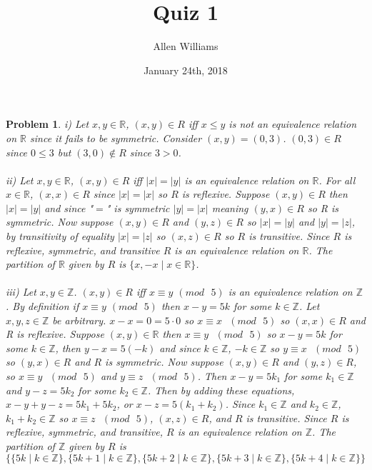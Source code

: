 \documentclass{article}
\title{Quiz 1}
\author{Allen Williams }
\date{January 24th, 2018}
\newtheorem{Problem}{Problem}
\begin{document}
\maketitle

\begin{Problem}
 i) Let $x,y\in\mathbb{R}$, $(x,y)\in R$ iff $x\leq y$ is not an equivalence relation on $\mathbb{R}$ since it fails to be symmetric.  Consider $(x,y)=(0,3)$.  $(0,3)\in R$ since $0\leq3$ but $(3,0)\not\in R$ since $3>0$.\\\\
ii) Let $x,y\in\mathbb{R}$, $(x,y)\in R$ iff $\lvert x\rvert=\lvert y\rvert$ is an equivalence relation on $\mathbb{R}$.  For all $x\in\mathbb{R}$, $(x,x)\in R$ since $\lvert x\rvert=\lvert x\rvert$ so $R$ is reflexive.  Suppose $(x,y)\in R$ then $\lvert x\rvert = \lvert y\rvert$ and since "$=$" is symmetric $\lvert y\rvert=\lvert x\rvert$ meaning $(y,x)\in R$ so R is symmetric.  Now suppose $(x,y)\in R $ and $(y,z)\in R$ so $\lvert x\rvert =\lvert y\rvert$ and $\lvert y\rvert=\lvert z\rvert$, by transitivity of equality $\lvert x\rvert=\lvert z\rvert$ so $(x,z)\in R$ so $R$ is transitive.  Since $R$ is reflexive, symmetric, and transitive $R$ is an equivalence relation on $\mathbb{R}$.  The partition of $\mathbb{R}$ given by $R$ is $\{x,-x\mid x\in\mathbb{R}\}$. \\\\
iii) Let $x,y\in\mathbb{Z}$.  $(x,y)\in R$ iff $x\equiv y$ $(mod\text{ }5)$ is an equivalence relation on $\mathbb{Z}$.  By definition if $x\equiv y$ $(mod\text{ }5)$ then $x-y=5k$ for some $k\in\mathbb{Z}$.  Let $x,y,z\in\mathbb{Z}$ be arbitrary.  $x-x=0=5\cdot0$ so $x\equiv x\text{ }(mod\text{ }5)$ so $(x,x)\in R$ and R is reflexive.  Suppose $(x,y)\in\mathbb{R}$ then $x\equiv y\text{ }(mod\text{ }5)$ so $x-y=5k$ for some $k\in\mathbb{Z}$, then $y-x=5(-k)$ and since $k\in\mathbb{Z}$, $-k\in\mathbb{Z}$ so $y\equiv x\text{ }(mod\text{ }5)$ so $(y,x)\in R$ and $R$ is symmetric.  Now suppose $(x,y)\in R$ and $(y,z)\in R$, so $x\equiv y\text{ }(mod\text{ }5)$ and $y\equiv z\text{ }(mod\text{ }5)$.  Then $x-y=5k_1$ for some $k_1\in\mathbb{Z}$ and $y-z=5k_2$ for some $k_2\in\mathbb{Z}$.  Then by adding these equations, $x-y+y-z=5k_1+5k_2$, or $x-z=5(k_1+k_2)$.  Since $k_1\in\mathbb{Z}$ and $k_2\in\mathbb{Z}$, $k_1+k_2\in\mathbb{Z}$ so $x\equiv z\text{ }(mod\text{ }5)$, $(x,z)\in R$, and $R$ is transitive.  Since $R$ is reflexive, symmetric, and transitive, $R$ is an equivalence relation on $\mathbb{Z}$.  The partition of $\mathbb{Z}$ given by $R$ is $\{\{5k\mid k\in\mathbb{Z}\},\{5k+1\mid k\in\mathbb{Z}\},\{5k+2\mid k\in\mathbb{Z}\},\{5k+3\mid k\in\mathbb{Z}\},\{5k+4\mid k\in\mathbb{Z}\}\}$
\end{Problem}
\end{document}
